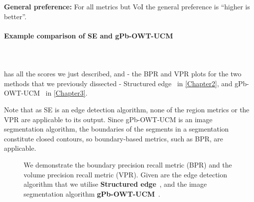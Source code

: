 \textbf{General preference:} For all metrics but VoI the general preference is ``higher is better''.

\paragraph*{Example comparison of SE and gPb-OWT-UCM}\mbox{}\\\mbox{}\\
 has all the scores we just described, and  - the BPR and VPR plots for the two methods that we previously dissected - Structured edge~\cite{DollarICCV13edges} in \cref{Chapter2}, and gPb-OWT-UCM~\cite{Arbelaez11} in \cref{Chapter3}. 

Note that as SE is an edge detection algorithm, none of the region metrics or the VPR are applicable to its output. Since gPb-OWT-UCM is an image segmentation algorithm, the boundaries of the segments in a segmentation constitute closed contours, so boundary-based metrics, such as BPR, are applicable.

\begin{figure}[ht!]
\centering
\caption[SE and gPb-OWT-UCM plots]{We demonstrate the boundary precision recall metric (BPR) and the volume precision recall metric (VPR). Given are the edge detection algorithm that we utilise {\bf Structured edge}~\cite{DollarICCV13edges}, and the image segmentation algorithm {\bf gPb-OWT-UCM}~\cite{Arbelaez11}.}
\label{fig:SE_vs_gPb_OWT_UCM}
\end{figure}

